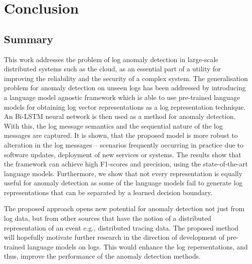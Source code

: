 \chapter{Conclusion\label{cha:conclusion}}



\section{Summary\label{sec:summary}}
This work addresses the problem of log anomaly detection in large-scale distributed systems such as the cloud, as an essential part of a utility for improving the reliability and the security of a complex system. The generalisation problem for anomaly detection on unseen logs has been addressed by introducing a language model agnostic framework which is able to use pre-trained language models for obtaining log vector representations as a log representation technique. An Bi-LSTM neural network is then used as a method for anomaly detection. With this,  the log message semantics and the sequential nature of the log messages are captured. It is shown, that the proposed model is more robust to alteration in the log messages -- scenarios frequently occurring in practice due to software updates, deployment of new services or systems. The results show that the  framework can achieve high F1-scores and precision, using the state-of-the-art language models. Furthermore, we show that not every representation is equally useful for anomaly detection as some of the language models fail to generate log representations that can be separated by a learned decision boundary. 

The proposed approach opens new potential for anomaly detection not just from log data, but from other sources that have the notion of a distributed representation of an event e.g., distributed tracing data. The proposed method will hopefully motivate further research in the direction of development of pre-trained language models on logs. This would enhance the log repersentations, and thus, improve the performance of the anomaly detection methods.



